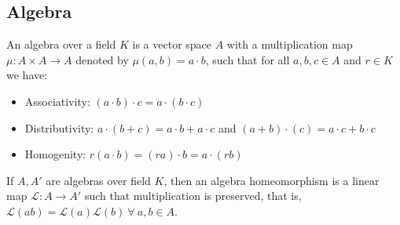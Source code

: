 \begin{appendices}
\section{Algebra}
An algebra over a field $K$ is a vector space $A$ with a multiplication map $\mu : A\times A \rightarrow A$ denoted by $\mu(a,b) = a\cdot b$, such that for all $a,b,c\in A$ and $r\in K$ we have: 
\begin{itemize}
    \item Associativity: $(a\cdot b)\cdot c = a\cdot (b\cdot c)$ 
    \item Distributivity: $a\cdot (b+c) = a\cdot b + a \cdot c$ and $(a+b)\cdot (c) = a\cdot c + b \cdot c$
    \item Homogenity: $r(a\cdot b) = (ra)\cdot b = a\cdot (rb)$
\end{itemize}
If $A,A'$ are algebras over field $K$, then an algebra homeomorphism is a linear map $\mathcal{L}: A\rightarrow A'$ such that multiplication is preserved, that is, $\mathcal{L}(ab) = \mathcal{L}(a)\mathcal{L}(b) \ \forall \ a,b \in A$. 
\end{appendices}